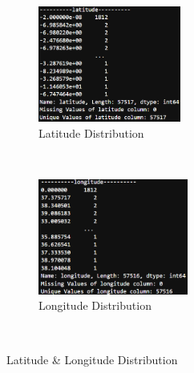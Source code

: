\documentclass[conference]{IEEEtran}
\begin{document}
\begin{figure}[t]
    \centering
    \begin{subfigure}[t]{0.3\textwidth}
      \centering
      \includegraphics[height=1.5in]{figures/jason_latitude.png}
      \caption{Latitude Distribution}
    \end{subfigure}%
    ~
    \begin{subfigure}[t]{0.3\textwidth}
      \centering
      \includegraphics[height=1.5in]{figures/jason_longitude.png}
      \caption{Longitude Distribution}
    \end{subfigure}
    ~
    \caption{Latitude \& Longitude Distribution}
    \label{fig:lat_long_distribution}
\end{figure}
\end{document}
